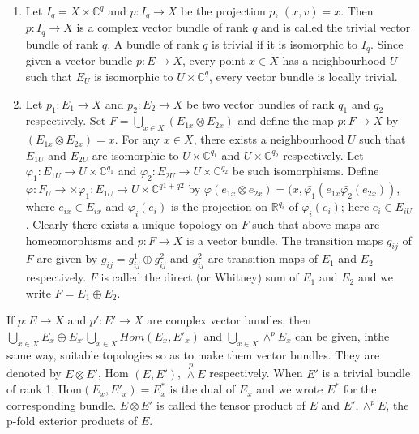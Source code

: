 \begin{examples*}
  \begin{enumerate}[(1)]
  \item Let $I_q=X \times \mathbb{C}^q$ and $p: I_q \to X$ be the
    projection $p$, $(x,v) = x$. Then $p:I_q \to X$ is a complex
    vector bundle of rank $q$ and is called the trivial vector
    bundle of rank $q$. A bundle of rank $q$ is trivial if it is
    isomorphic to $I_q$. Since given a vector bundle $p:E \to X$,
    every point $x \in X$ has a neighbourhood $U$ such that $E_U$ is
    isomorphic to $U \times \mathbb{C}^q$, every vector bundle is
    locally trivial. 

  \item Let $p_1 :E _1 \to X$ and $p_2:E_2 \to X$ be two vector
    bundles of rank $q_1$ and $q_2 $ respectively. Set $F= \bigcup
    \limits_{x \in X}(E_{1x} \otimes E_{2x})$ and define the map $p:F
    \to X$ by $(E_{1x} \otimes E_{2x})=x$. For any $x \in X$, there
    exists a neighbourhood $U$ such that $E_{1U}$ and $E_{2U}$ are
    isomorphic to $U \times \mathbb{C}^{q_1}$ and $U \times
    \mathbb{C}^{q_2}$ respectively. Let $\varphi_1 : E_{1U} \to U
    \times \mathbb{C}^{q_1}$ and $\varphi_2 : E_{2U} \to U \times
    \mathbb{C}^{q_2}$ be such isomorphisms. Define $\varphi :F_U \to
    \times \varphi_1 : E_{1U} \to U \times \mathbb{C}^{q1+q2}$ by
    $\varphi (e_{1x} \otimes e_{2x})=(x, \bar{\varphi_1}
    (e_{1x}\bar{\varphi_2} (e_{2x}))$, where $e_{ix} \in E_{ix}$ and
    $\bar{\varphi _i}(e_i)$ is the projection on $\mathbb{R}^{q_i}$ of
    $\varphi_i(e_i)$; here $e_i\in E_{iU}$. Clearly there exists a
    unique topology on $F$ such that
    above maps are homeomorphisms and $p:F \to X$ is a vector
    bundle. The transition maps $g_{ij}$ of $F$ are given by
    $g_{ij}=g^1_{ij} \oplus g^2_{ij}$ and $g^2_{ij}$ are transition
    maps of $E_1$ and $E_2$ respectively. $F$ is called the direct (or
    Whitney) sum of $E_1$ and $E_2$ and we write $F=E_1 \oplus E_2$. 
  \end{enumerate}
\end{examples*}

If $p:E \to X$ and $p':E' \to X$ are complex vector bundles, then
$\bigcup \limits_{x \in X} E_x \oplus E_{x'}\bigcup \limits_{x \in X}
Hom (E_x,E'_x)$ and $\bigcup \limits_{x \in X}\wedge^p E_x$ can be
given, in\pageoriginale the same way, suitable topologies so as to make them vector
bundles. They are denoted by $E \otimes E'$, Hom $(E, E')$,
$\overset{p}\wedge E$ respectively. When $E'$ is a trivial bundle of
rank 1, Hom$(E_x, E'_x)=E^*_x$ is the dual of $E_x$ and we wrote $E^*$
for the corresponding bundle. $E \otimes E'$ is called the tensor
product of $E$ and $E', \wedge^p E$, the p-fold exterior products of
$E$. 


